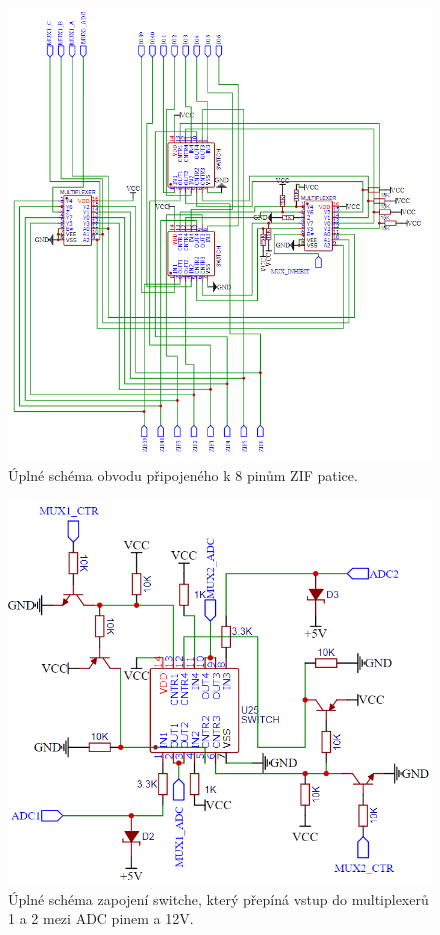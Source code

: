 \documentclass[11pt,a4paper,twoside,openright]{report}
\begin{document}
\begin{figure}[ht!]
  \includegraphics[width=\linewidth]{img/pin_switches.png}
  \centering
  \caption{Úplné schéma obvodu připojeného k 8 pinům ZIF patice.}
  \label{appendix:pin_switches}
\end{figure}

\begin{figure}[ht!]
  \includegraphics[width=\linewidth]{img/mux_input_control.png}
  \centering
  \caption{Úplné schéma zapojení switche, který přepíná vstup do multiplexerů 1 a 2 mezi ADC pinem a 12V.}
  \label{appendix:mux_input_control}
\end{figure}
\end{document}
